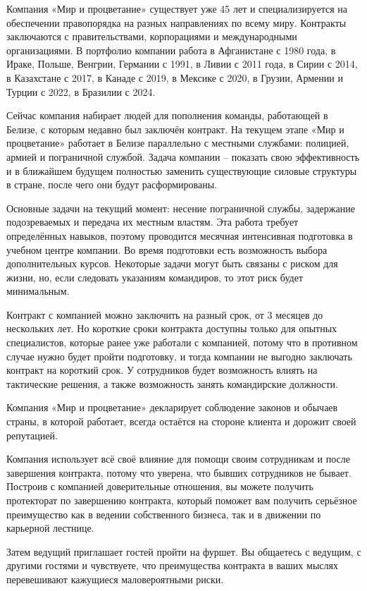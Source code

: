 \documentclass[
]{article}
\begin{document}
Компания «Мир и процветание» существует уже 45 лет и специализируется на
обеспечении правопорядка на разных направлениях по всему миру. Контракты
заключаются с правительствами, корпорациями и международными
организациями. В портфолио компании работа в Афганистане с 1980 года, в
Ираке, Польше, Венгрии, Германии с 1991, в Ливии с 2011 года, в Сирии с
2014, в Казахстане с 2017, в Канаде с 2019, в Мексике с 2020, в Грузии,
Армении и Турции с 2022, в Бразилии с 2024.

Сейчас компания набирает людей для пополнения команды, работающей в
Белизе, с которым недавно был заключён контракт. На текущем этапе «Мир и
процветание» работает в Белизе параллельно с местными службами:
полицией, армией и пограничной службой. Задача компании -- показать свою
эффективность и в ближайшем будущем полностью заменить существующие
силовые структуры в стране, после чего они будут расформированы.

Основные задачи на текущий момент: несение пограничной службы,
задержание подозреваемых и передача их местным властям. Эта работа
требует определённых навыков, поэтому проводится месячная интенсивная
подготовка в учебном центре компании. Во время подготовки есть
возможность выбора дополнительных курсов. Некоторые задачи могут быть
связаны с риском для жизни, но, если следовать указаниям командиров, то
этот риск будет минимальным.

Контракт с компанией можно заключить на разный срок, от 3 месяцев до
нескольких лет. Но короткие сроки контракта доступны только для опытных
специалистов, которые ранее уже работали с компанией, потому что в
противном случае нужно будет пройти подготовку, и тогда компании не
выгодно заключать контракт на короткий срок. У сотрудников будет
возможность влиять на тактические решения, а также возможность занять
командирские должности.

Компания «Мир и процветание» декларирует соблюдение законов и обычаев
страны, в которой работает, всегда остаётся на стороне клиента и дорожит
своей репутацией.

Компания использует всё своё влияние для помощи своим сотрудникам и
после завершения контракта, потому что уверена, что бывших сотрудников
не бывает. Построив с компанией доверительные отношения, вы можете
получить протекторат по завершению контракта, который поможет вам
получить серьёзное преимущество как в ведении собственного бизнеса, так
и в движении по карьерной лестнице.

Затем ведущий приглашает гостей пройти на фуршет. Вы общаетесь с
ведущим, с другими гостями и чувствуете, что преимущества контракта в
ваших мыслях перевешивают кажущиеся маловероятными риски.
\end{document}
